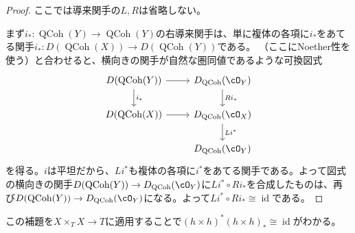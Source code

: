 \documentclass[uplatex, a4paper, dvipdfmx]{jsarticle}
\theoremstyle{definition}
\DeclareMathOperator{\id}{\mathrm{id}}
\DeclareMathOperator{\QCoh}{\mathrm{QCoh}}
\begin{document}
\begin{proof}
    ここでは導来関手の$L, R$は省略しない。

    まず$i_* \colon \QCoh(Y) \to \QCoh(Y)$の右導来関手は、単に複体の各項に$i_*$をあてる関手$i_* \colon D(\QCoh(X)) \to D(\QCoh(Y))$である。
    \cite[\href{https://stacks.math.columbia.edu/tag/09T3}{Tag 09T3}]{stacks-project}（ここにNoether性を使う）と合わせると、横向きの関手が自然な圏同値であるような可換図式
    \[
        \begin{tikzcd}
            D(\QCoh(Y)) \ar[r] \ar[d, "i_*"] & D_{\QCoh}(\cO_Y) \ar[d, "Ri_*"]\\
            D(\QCoh(X)) \ar[r]& D_{\QCoh}(\cO_X) \ar[d, "Li^*"]\\
            & D_{\QCoh}(\cO_Y)
        \end{tikzcd}
    \]
    を得る。$i$は平坦だから、$Li^*$も複体の各項に$i^*$をあてる関手である。よって図式の横向きの関手$D(\QCoh(Y)) \to D_{\QCoh}(\cO_Y)$に$Li^* \circ Ri_*$を合成したものは、再び$D(\QCoh(Y)) \to D_{\QCoh}(\cO_Y)$になる。よって$Li^* \circ Ri_* \cong \id$である。
\end{proof}
この補題を$X \times_T X \to T$に適用することで$(h \times h)^*(h \times h)_* \cong \id$がわかる。
\end{document}
